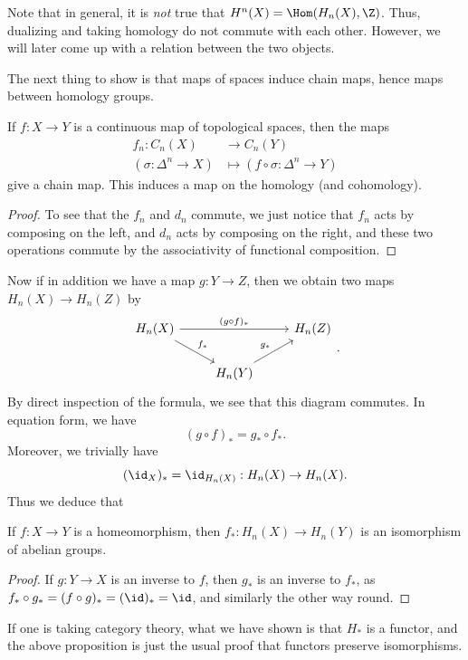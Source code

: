 \documentclass[a4paper]{article}
\theoremstyle{definition}
\begin{document}
Note that in general, it is \emph{not} true that $H^n(X) = \Hom(H_n(X), \Z)$. Thus, dualizing and taking homology do not commute with each other. However, we will later come up with a relation between the two objects.

The next thing to show is that maps of spaces induce chain maps, hence maps between homology groups.

\begin{prop}
  If $f: X \to Y$ is a continuous map of topological spaces, then the maps
  \begin{align*}
    f_n: C_n(X) &\to C_n(Y)\\
    (\sigma: \Delta^n \to X) &\mapsto (f \circ \sigma: \Delta^n \to Y)
  \end{align*}
  give a chain map. This induces a map on the homology (and cohomology).
\end{prop}

\begin{proof}
  To see that the $f_n$ and $d_n$ commute, we just notice that $f_n$ acts by composing on the left, and $d_n$ acts by composing on the right, and these two operations commute by the associativity of functional composition.
\end{proof}

Now if in addition we have a map $g: Y \to Z$, then we obtain two maps $H_n(X) \to H_n(Z)$ by
\[
  \begin{tikzcd}
    H_n(X) \ar[rr, "(g \circ f)_*"] \ar[rd, "f_*"] & & H_n(Z)\\
    & H_n(Y) \ar[ru, "g_*"]
  \end{tikzcd}.
\]
By direct inspection of the formula, we see that this diagram commutes. In equation form, we have
\[
  (g \circ f)_* = g_* \circ f_*.
\]
Moreover, we trivially have
\[
  (\id_X)_* = \id_{H_n(X)}: H_n(X) \to H_n(X).
\]
Thus we deduce that
\begin{prop}
  If $f: X \to Y$ is a homeomorphism, then $f_*: H_n(X) \to H_n(Y)$ is an isomorphism of abelian groups.
\end{prop}

\begin{proof}
  If $g: Y \to X$ is an inverse to $f$, then $g_*$ is an inverse to $f_*$, as $f_* \circ g_* = (f \circ g)_* = (\id)_* = \id$, and similarly the other way round.
\end{proof}
If one is taking category theory, what we have shown is that $H_*$ is a functor, and the above proposition is just the usual proof that functors preserve isomorphisms.
\end{document}
